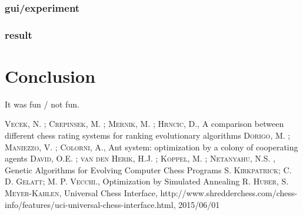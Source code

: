 \documentclass[pdftex]{article}
\begin{document}
\subsubsection{gui/experiment}
\subsubsection{result}

\section{Conclusion}
\label{sec:conclusion}

It was fun / not fun.

\begin{thebibliography}{99}

 \textsc{Vecek, N. ; Crepinsek, M. ; Mernik, M. ; Hrncic, D.}, A comparison between different chess rating systems for ranking evolutionary algorithms 
 \textsc{Dorigo, M. ; Maniezzo, V. ; Colorni, A.}, Ant system: optimization by a colony of cooperating agents 
 \textsc{David, O.E. ; van den Herik, H.J. ; Koppel, M. ; Netanyahu, N.S. }, Genetic Algorithms for Evolving Computer Chess Programs 
 \textsc{S. Kirkpatrick; C. D. Gelatt; M. P. Vecchi.}, Optimization by Simulated Annealing 
 \textsc{R. Huber, S. Meyer-Kahlen}, Universal Chess Interface, http://www.shredderchess.com/chess-info/features/uci-universal-chess-interface.html, 2015/06/01

\end{thebibliography}
\end{document}
